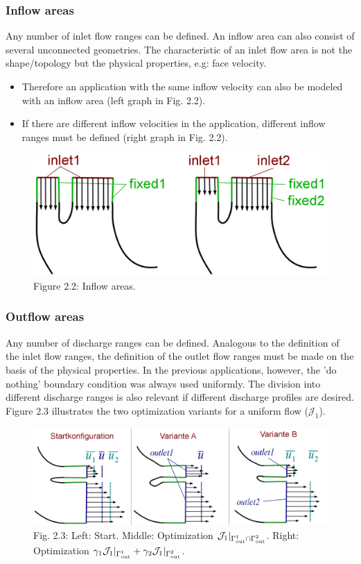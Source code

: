\documentclass[oneside]{article}
\numberwithin{equation}{section}
\numberwithin{figure}{section}
\numberwithin{figure}{section}
\begin{document}
\subsubsection{Inflow areas}
Any number of inlet flow ranges can be defined. An inflow area can also consist of several unconnected geometries. The characteristic of an inlet flow area is not the shape/topology but the physical properties, e.g: face velocity.
\begin{itemize}
    \item Therefore an application with the same inflow velocity can also be modeled with an inflow area (left graph in Fig. 2.2).
    \item If there are different inflow velocities in the application, different inflow ranges must be defined (right graph in Fig. 2.2).
\end{itemize}
\begin{figure}[htbp]
    \centering
    \includegraphics[scale=0.53]{inletMULT.png}   
    \caption{Figure 2.2: Inflow areas.}
    \label{fig:multInlet}
\end{figure}

\subsubsection{Outflow areas}
Any number of discharge ranges can be defined. Analogous to the definition of the inlet flow ranges, the definition of the outlet flow ranges must be made on the basis of the physical properties. In the previous applications, however, the 'do nothing' boundary condition was always used uniformly. The division into different discharge ranges is also relevant if different discharge profiles are desired. Figure 2.3 illustrates the two optimization variants for a uniform flow ($\mathcal{J}_1$).
\begin{figure}[htbp]
    \centering
    \includegraphics[scale=0.53]{outletMULT.png}   
    \caption{Fig. 2.3: Left: Start. Middle: Optimization $\mathcal{J}_1|_{\Gamma_{\rm out}^1\cap\Gamma_{\rm out}^2}$. Right: Optimization $\gamma_1\mathcal{J}_1|_{\Gamma_{\rm out}^1} + \gamma_2\mathcal{J}_1|_{\Gamma_{\rm out}^2}$.}
    \label{fig:multOutlet}
\end{figure}
\end{document}
